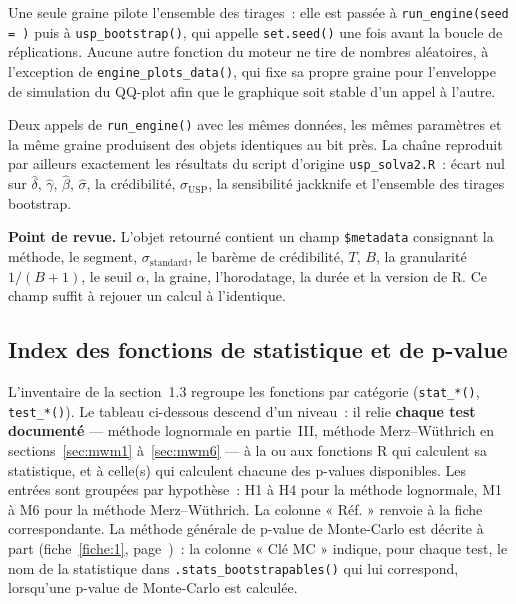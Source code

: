 \documentclass[a4paper,11pt]{article}
\newcommand{\code}[1]{\texttt{\small #1}}
\begin{document}
Une seule graine pilote l'ensemble des tirages~: elle est passée à
\code{run\_engine(seed = )} puis à \code{usp\_bootstrap()}, qui appelle
\code{set.seed()} une fois avant la boucle de réplications. Aucune autre
fonction du moteur ne tire de nombres aléatoires, à l'exception de
\code{engine\_plots\_data()}, qui fixe sa propre graine pour l'enveloppe de
simulation du QQ-plot afin que le graphique soit stable d'un appel à l'autre.

Deux appels de \code{run\_engine()} avec les mêmes données, les mêmes paramètres
et la même graine produisent des objets identiques au bit près. La chaîne
reproduit par ailleurs exactement les résultats du script d'origine
\code{usp\_solva2.R}~: écart nul sur $\hat\delta$, $\hat\gamma$, $\hat\beta$,
$\hat\sigma$, la crédibilité, $\sigma_{\mathrm{USP}}$, la sensibilité jackknife
et l'ensemble des tirages bootstrap.

\begin{encadre}
\textbf{Point de revue.} L'objet retourné contient un champ \code{\$metadata}
consignant la méthode, le segment, $\sigma_{\text{standard}}$, le barème de
crédibilité, $T$, $B$, la granularité $1/(B+1)$, le seuil $\alpha$, la graine,
l'horodatage, la durée et la version de R. Ce champ suffit à rejouer un calcul
à l'identique.
\end{encadre}

\subsection{Index des fonctions de statistique et de p-value}
\label{sec:index-fonctions}

L'inventaire de la section~1.3 regroupe les fonctions par catégorie
(\code{stat\_*()}, \code{test\_*()}). Le tableau ci-dessous descend d'un niveau~:
il relie \textbf{chaque test documenté} --- méthode lognormale en partie~III,
méthode Merz--Wüthrich en sections~\ref{sec:mwm1} à~\ref{sec:mwm6} --- à la ou aux fonctions R
qui calculent sa statistique, et à celle(s) qui calculent chacune des p-values
disponibles. Les entrées sont groupées par hypothèse~: H1 à H4 pour la méthode
lognormale, M1 à M6 pour la méthode Merz--Wüthrich. La colonne « Réf. » renvoie à la fiche correspondante. La méthode
générale de p-value de Monte-Carlo est décrite à part
(fiche~\ref{fiche:1}, page~\pageref{fiche:1})~: la colonne « Clé MC » indique,
pour chaque test, le nom de la statistique dans \code{.stats\_bootstrapables()}
qui lui correspond, lorsqu'une p-value de Monte-Carlo est calculée.
\end{document}
